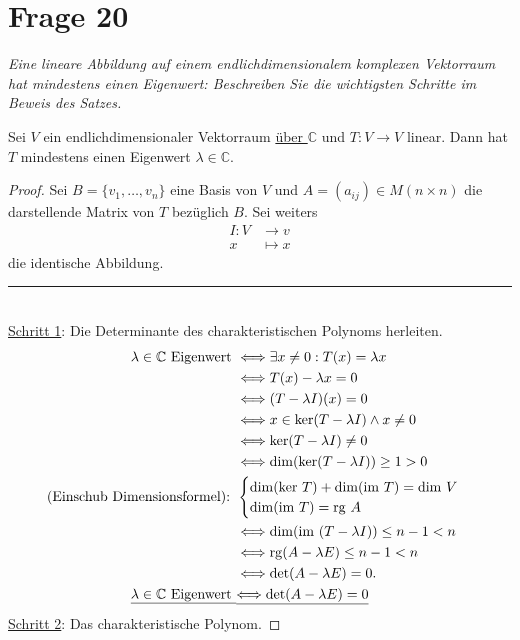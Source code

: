 \section{Frage 20}
\textit{Eine lineare Abbildung auf einem endlichdimensionalem komplexen Vektorraum hat mindestens einen Eigenwert:
Beschreiben Sie die wichtigsten Schritte im Beweis des Satzes.}
\begin{theorem}
    Sei $V$ ein endlichdimensionaler Vektorraum \underline{über $\mathbb{C}$} und $T:V\to V$ linear. Dann hat
    $T$ mindestens einen Eigenwert $\lambda\in\mathbb{C}$.
\end{theorem}
\begin{proof}
    Sei $B=\{v_1,\dots,v_n\}$ eine Basis von $V$ und $A=(a_{ij})\in M(n\times n)$ die darstellende Matrix
    von $T$ bezüglich $B$. Sei weiters 
    \begin{align*}
        I : V&\to v\\
        x &\mapsto x
    \end{align*}
    die identische Abbildung.\\
    \rule{\textwidth}{0.2px}\\
    \underline{Schritt 1}: Die Determinante des charakteristischen Polynoms herleiten.
    \begin{align*}
        \lambda\in \mathbb{C} \text{ Eigenwert } &\Longleftrightarrow \exists x\neq 0 : T(x)=\lambda x\\
        &\Longleftrightarrow T(x) - \lambda x = 0\\
        &\Longleftrightarrow (T-\lambda I) (x) = 0\\
        &\Longleftrightarrow x\in \mathrm{ker}(T-\lambda I) \land x\neq 0\\
        &\Longleftrightarrow\mathrm{ker}(T-\lambda I)\neq 0\\
        &\Longleftrightarrow\mathrm{dim}(\mathrm{ker}(T-\lambda I)) \geq 1 > 0\\
        \text{(Einschub Dimensionsformel): } &\begin{cases}
            \mathrm{dim}(\mathrm{ker}\ T) + \mathrm{dim}(\mathrm{im}\ T) = \mathrm{dim}\ V\\
            \mathrm{dim}(\mathrm{im}\ T)=\mathrm{rg}\ A
        \end{cases}\\
        &\Longleftrightarrow\mathrm{dim}(\mathrm{im}\ (T-\lambda I)) \leq n-1 < n\\
        &\Longleftrightarrow\mathrm{rg}(A-\lambda E) \leq n-1 < n\\
        &\Longleftrightarrow\det (A- \lambda E) = 0.\\
        \underline{\lambda\in \mathbb{C} \text{ Eigenwert } }&\underline{\Longleftrightarrow \det (A- \lambda E) = 0}
    \end{align*}
    \underline{Schritt 2}: Das charakteristische Polynom.
    

\end{proof}
